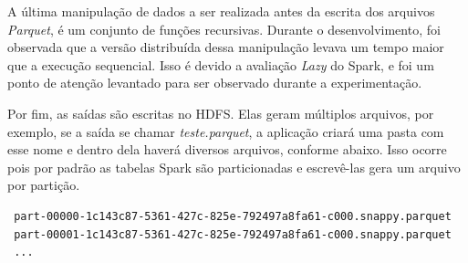 A última manipulação de dados a ser realizada antes da escrita dos arquivos 
\textit{Parquet}, é um conjunto de funções recursivas. Durante o 
desenvolvimento, foi observada que a versão distribuída dessa manipulação levava 
um tempo maior que a execução sequencial. Isso é devido a avaliação \emph{Lazy} 
do Spark, e foi um ponto de atenção levantado para ser observado durante a 
experimentação.

Por fim, as saídas são escritas no HDFS. Elas geram múltiplos arquivos, por 
exemplo, se a saída se chamar \emph{teste.parquet}, a aplicação criará uma pasta 
com esse nome e dentro dela haverá diversos arquivos, conforme abaixo. Isso 
ocorre pois por padrão as tabelas Spark são particionadas e escrevê-las gera um 
arquivo por partição.

\footnotesize
\begin{lstlisting}
 part-00000-1c143c87-5361-427c-825e-792497a8fa61-c000.snappy.parquet
 part-00001-1c143c87-5361-427c-825e-792497a8fa61-c000.snappy.parquet
 ...
\end{lstlisting}






